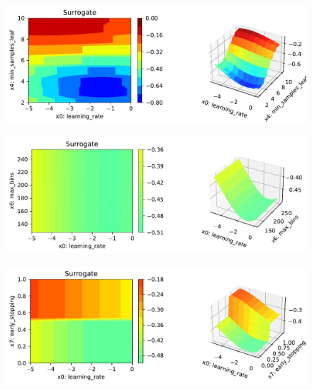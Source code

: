 \documentclass[
  letterpaper,
  DIV=11,
  numbers=noendperiod]{scrreprt}
\begin{document}
\begin{figure}[H]

{\centering \includegraphics{17_spot_hpt_sklearn_multiclass_classification_xgb_files/figure-pdf/cell-46-output-3.pdf}

}

\end{figure}

\begin{figure}[H]

{\centering \includegraphics{17_spot_hpt_sklearn_multiclass_classification_xgb_files/figure-pdf/cell-46-output-4.pdf}

}

\end{figure}

\begin{figure}[H]

{\centering \includegraphics{17_spot_hpt_sklearn_multiclass_classification_xgb_files/figure-pdf/cell-46-output-5.pdf}

}

\end{figure}
\end{document}
